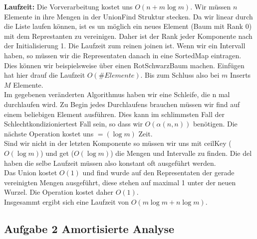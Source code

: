 \documentclass[11pt,a4paper,ngerman]{article}
\begin{document}
\begin{enumerate}[\bfseries a)]
\textbf{Laufzeit:}
Die Vorverarbeitung kostet uns $O(n + m \log m)$. Wir müssen $n$ Elemente in ihre Mengen in der UnionFind Struktur stecken. Da wir linear durch die Liste laufen können, ist es un möglich ein neues Element (Baum mit Rank 0) mit dem Represtanten zu vereinigen. Daher ist der Rank jeder Komponente nach der Initialisierung 1. Die Laufzeit zum reinen joinen ist. Wenn wir ein Intervall haben, so müssen wir die Representaten danach in eine SortedMap eintragen. Dies können wir beispielsweise über einen RotSchwarzBaum machen. Einfügen hat hier drauf die Laufzeit $O(\#Elemente)$. Bis zum Schluss also bei $m$ Inserts $M$ Elemente.\\

Im gegebenen veränderten Algorithmus haben wir eine Schleife, die n mal durchlaufen wird. Zu Begin jedes Durchlaufens brauchen müssen wir find auf einem beliebigen Element ausführen. Dies kann im schlimmsten Fall der Schlechtkondizioniertest Fall sein, so dass wir $O(\alpha (n,n))$ benötigen. Die nächste Operation kostet uns $=(\log m)$ Zeit.\\

Sind wir nicht in der letzten Komponente so müssen wir uns mit ceilKey ($O ( \log m) $) und get  ($O(\log m)$) die Mengen und Intervalle zu finden. Die del haben die selbe Laufzeit müssen also konstant oft ausgeführt werden.\\

Das Union kostet $O (1)$ und find wurde auf den Representaten der gerade vereinigten Mengen ausgeführt, diese stehen auf maximal 1 unter der neuen Wurzel. Die Operation kostet daher $O(1)$.\\

Insgesammt ergibt sich eine Laufzeit von $O (m \log m + n \log m)$.

\end{enumerate}

\pagebreak

\subsection*{Aufgabe 2 \mdseries Amortisierte Analyse}
\end{document}
